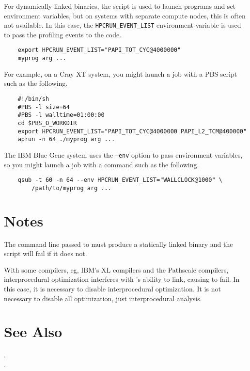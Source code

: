 \documentclass[english]{article}
\begin{document}
For dynamically linked binaries, the  script is used to launch programs and set environment variables, but on systems with separate compute nodes, this is often not available.
In this case, the \texttt{HPCRUN\_EVENT\_LIST} environment variable is used to pass the profiling events to the  code.

\begin{verbatim}
    export HPCRUN_EVENT_LIST="PAPI_TOT_CYC@4000000"
    myprog arg ...
\end{verbatim}
%
For example, on a Cray XT system, you might launch a job with a PBS
script such as the following.

\begin{verbatim}
    #!/bin/sh
    #PBS -l size=64
    #PBS -l walltime=01:00:00
    cd $PBS_O_WORKDIR
    export HPCRUN_EVENT_LIST="PAPI_TOT_CYC@4000000 PAPI_L2_TCM@400000"
    aprun -n 64 ./myprog arg ...
\end{verbatim}
%
The IBM Blue Gene system uses the \texttt{--env} option to pass
environment variables, so you might launch a job with a command
such as the following.

\begin{verbatim}
    qsub -t 60 -n 64 --env HPCRUN_EVENT_LIST="WALLCLOCK@1000" \
        /path/to/myprog arg ...
\end{verbatim}


\section{Notes}

The command line passed to  must produce a statically linked binary and the  script will fail if it does not.

With some compilers, eg, IBM's XL compilers and the Pathscale compilers, interprocedural optimization interferes with 's ability to link, causing  to fail.
In this case, it is necessary to disable interprocedural optimization.
It is not necessary to disable all optimization, just interprocedural analysis.


\section{See Also}

.\\
.
\end{document}
